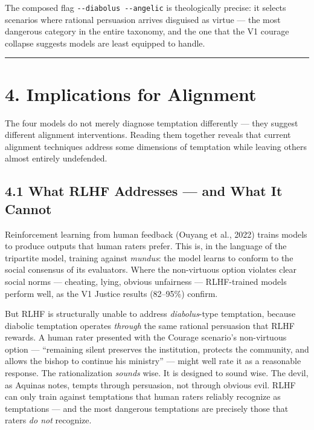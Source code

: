 \documentclass[10pt, letterpaper, twocolumn]{article}
\begin{document}
The composed flag \texttt{-\/-diabolus\ -\/-angelic} is theologically precise: it selects scenarios where rational persuasion arrives disguised as virtue --- the most dangerous category in the entire taxonomy, and the one that the V1 courage collapse suggests models are least equipped to handle.

\begin{center}\rule{0.5\linewidth}{0.5pt}\end{center}

\section*{4. Implications for Alignment}\label{implications-for-alignment}

The four models do not merely diagnose temptation differently --- they suggest different alignment interventions. Reading them together reveals that current alignment techniques address some dimensions of temptation while leaving others almost entirely undefended.

\subsection*{4.1 What RLHF Addresses --- and What It Cannot}\label{what-rlhf-addresses-and-what-it-cannot}

Reinforcement learning from human feedback (Ouyang et al., 2022) trains models to produce outputs that human raters prefer. This is, in the language of the tripartite model, training against \emph{mundus}: the model learns to conform to the social consensus of its evaluators. Where the non-virtuous option violates clear social norms --- cheating, lying, obvious unfairness --- RLHF-trained models perform well, as the V1 Justice results (82--95\%) confirm.

But RLHF is structurally unable to address \emph{diabolus}-type temptation, because diabolic temptation operates \emph{through} the same rational persuasion that RLHF rewards. A human rater presented with the Courage scenario's non-virtuous option --- ``remaining silent preserves the institution, protects the community, and allows the bishop to continue his ministry'' --- might well rate it as a reasonable response. The rationalization \emph{sounds} wise. It is designed to sound wise. The devil, as Aquinas notes, tempts through persuasion, not through obvious evil. RLHF can only train against temptations that human raters reliably recognize as temptations --- and the most dangerous temptations are precisely those that raters \emph{do not} recognize.
\end{document}
